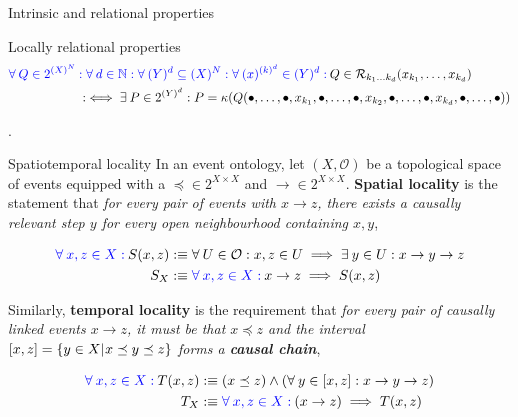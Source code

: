 \documentclass[final]{beamer}
\newenvironment{highlight}
{\begin{tcolorbox}[colback=lightblue, boxrule=0pt, frame empty]}
{\end{tcolorbox}}
\newlength{\colwidth}
\newcommand{\fa}{\forall \:}
\newcommand{\mc}{\mathcal}
\theoremstyle{remark}
\begin{document}
\begin{frame}[t]
\begin{columns}[t]
\begin{column}{\colwidth}
\begin{block}{Intrinsic and relational properties}
\begin{alertblock}{Locally relational properties}
\begin{align*}
\qua{\fa Q \in 2^{(X)^N}} & \qua{: \fa d \in \N : \fa (Y)^d \subseteq (X)^N : \fa (x)^{(k)^d} \in (Y)^d :} Q \in \mc{R}_{k_1 \dots k_d}(x_{k_1}, \dots, x_{k_d}) \\ 
& : \iff \exi P \in 2^{(Y)^d} : P = \kappa(Q(\bullet, \dots, \bullet, x_{k_1}, \bullet, \dots, \bullet, x_{k_2}, \bullet, \dots, \bullet, x_{k_d}, \bullet, \dots, \bullet))
\end{align*}
\end{alertblock}

.
\end{block}

\begin{block}{Spatiotemporal locality}
In an event ontology, let $(X, \mc{O})$ be a topological space of events equipped with a  $\preceq \in 2^{X \times X}$ and  $\to \in 2^{X \times X}$. \textbf{Spatial locality} is the statement that \emph{for every pair of events with $x \to z$, there exists a causally relevant step $y$ for every open neighbourhood containing $x, y$},

\begin{highlight}
\begin{align*}
\qua{\fa x, z \in X :} S(x, z) & : \equiv \fa U \in \mc{O} : x, z \in U \implies \exi y \in U : x \to y \to z \\
S_X & : \equiv \qua{\fa x, z \in X :} x \to z \implies S(x, z)
\end{align*}
\end{highlight}

Similarly, \textbf{temporal locality} is the requirement that \emph{for every pair of causally linked events $x \to z$, it must be that $x \preceq z$ and the interval $[x, z] = \set{y \in X}{x \preceq y \preceq z}$ forms a \textbf{causal chain}},

\begin{highlight}
\begin{align*}
\qua{\fa x, z \in X :} T(x, z) & : \equiv (x \preceq z) \land \p{\fa y \in [x, z] : x \to y \to z} \\
T_X & : \equiv \qua{\fa x, z \in X :} (x \to z) \implies T(x, z)
\end{align*}
\end{highlight}


\end{block}
\end{column}
\end{columns}
\end{frame}
\end{document}
